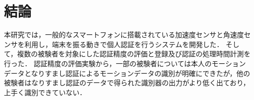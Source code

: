 \chapter{結論}
本研究では，一般的なスマートフォンに搭載されている加速度センサと角速度センサを利用し，端末を振る動きで個人認証を行うシステムを開発した．
そして，複数の被験者を対象にした認証精度の評価と登録及び認証の処理時間計測を行った．
認証精度の評価実験から，一部の被験者については本人のモーションデータとなりすまし認証によるモーションデータの識別が明確にできたが，他の被験者はなりすまし認証のデータで得られた識別器の出力がより低く出ており，上手く識別できていない．

